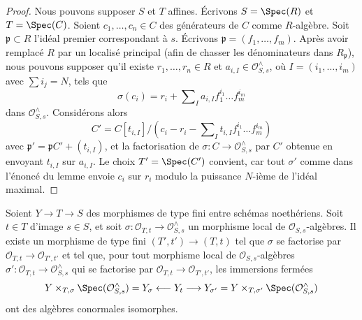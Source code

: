 \begin{proof}
Nous pouvons supposer $S$ et $T$ affines. Écrivons $S = \Spec(R)$ et
$T = \Spec(C)$. Soient $c_1, \ldots, c_n \in C$ des générateurs
de $C$ comme $R$-algèbre. Soit $\mathfrak p \subset R$ l'idéal
premier correspondant à $s$. Écrivons $\mathfrak p = (f_1, \ldots, f_m)$.
Après avoir remplacé $R$ par un localisé principal
(afin de chasser les dénominateurs dans $R_\mathfrak p$),
nous pouvons supposer qu'il existe
$r_1, \ldots, r_n \in R$ et $a_{i, I} \in \mathcal{O}_{S, s}^\wedge$,
où $I = (i_1, \ldots, i_m)$ avec $\sum i_j = N$, tels que
$$
\sigma(c_i) = r_i + \sum\nolimits_I a_{i, I} f_1^{i_1} \ldots f_m^{i_m}
$$
dans $\mathcal{O}_{S, s}^\wedge$. Considérons alors
$$
C' = C[t_{i, I}]/
\left(c_i - r_i - \sum\nolimits_I t_{i, I} f_1^{i_1} \ldots f_m^{i_m}\right)
$$
avec $\mathfrak p' = \mathfrak pC' + (t_{i, I})$, et la factorisation
de $\sigma : C \to \mathcal{O}_{S, s}^\wedge$ par $C'$
obtenue en envoyant $t_{i, I}$ sur $a_{i, I}$.
Le choix $T' = \Spec(C')$ convient, car tout $\sigma'$ comme dans l'énoncé
du lemme envoie $c_i$ sur $r_i$ modulo la
puissance $N$-ième de l'idéal maximal.
\end{proof}

\begin{lemma}
\label{lemma-control-graded}
Soient $Y \to T \to S$ des morphismes de type fini entre schémas noethériens.
Soit $t \in T$ d'image $s \in S$, et soit
$\sigma : \mathcal{O}_{T, t} \to \mathcal{O}_{S, s}^\wedge$
un morphisme local de $\mathcal{O}_{S, s}$-algèbres.
Il existe un morphisme de type fini $(T', t') \to (T, t)$
tel que $\sigma$ se factorise par
$\mathcal{O}_{T, t} \to \mathcal{O}_{T', t'}$
et tel que, pour tout morphisme local de $\mathcal{O}_{S, s}$-algèbres
$\sigma' : \mathcal{O}_{T, t} \to \mathcal{O}_{S, s}^\wedge$
qui se factorise par $\mathcal{O}_{T, t} \to \mathcal{O}_{T', t'}$,
les immersions fermées
$$
Y \times_{T, \sigma} \Spec(\mathcal{O}_{S, s}^\wedge) = Y_\sigma
\longleftarrow Y_t \longrightarrow
Y_{\sigma'} =
Y \times_{T, \sigma'} \Spec(\mathcal{O}_{S, s}^\wedge)
$$
ont des algèbres conormales isomorphes.
\end{lemma}

